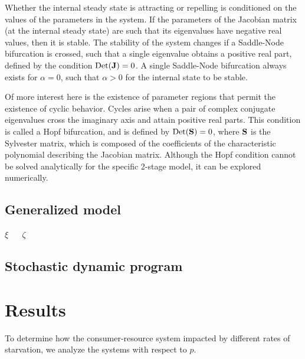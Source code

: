 \documentclass[11pt]{iopart}
\begin{document}
Whether the internal steady state is attracting or repelling is conditioned
on the values of the parameters in the system.  If the parameters of the
Jacobian matrix (at the internal steady state) are such that its eigenvalues
have negative real values, then it is stable.  The stability of the system
changes if a Saddle-Node bifurcation is crossed, such that a single
eigenvalue obtains a positive real part, defined by the condition
${\rm Det}({\bf J})=0$.  A single Saddle-Node bifurcation always exists for
$\alpha = 0$, such that $\alpha > 0$ for the internal state to be stable.

Of more interest here is the existence of parameter regions that permit the
existence of cyclic behavior.  Cycles arise when a pair of complex conjugate
eigenvalues cross the imaginary axis and attain positive real parts.  This
condition is called a Hopf bifurcation, and is defined by
${\rm Det}({\bf S}) = 0$, where $\bf S$ is the Sylvester matrix, which is
composed of the coefficients of the characteristic polynomial describing the
Jacobian matrix.  Although the Hopf condition cannot be solved analytically
for the specific 2-stage model, it can be explored numerically.

\subsection{Generalized model}

$\xi$ ~~ $\zeta$

\subsection{Stochastic dynamic program}


\section{Results}

To determine how the consumer-resource system impacted by different rates of starvation, we analyze the systems with respect to $p$.
\end{document}
